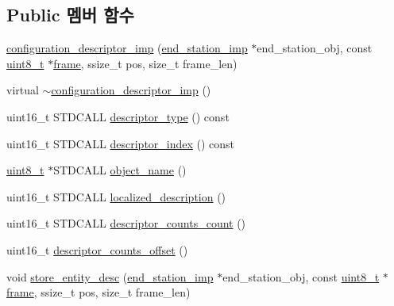 \subsection*{Public 멤버 함수}
\begin{DoxyCompactItemize}
\item 
\hyperlink{classavdecc__lib_1_1configuration__descriptor__imp_ac3616347ca0173a379b8e23fc19d210a}{configuration\+\_\+descriptor\+\_\+imp} (\hyperlink{classavdecc__lib_1_1end__station__imp}{end\+\_\+station\+\_\+imp} $\ast$end\+\_\+station\+\_\+obj, const \hyperlink{stdint_8h_aba7bc1797add20fe3efdf37ced1182c5}{uint8\+\_\+t} $\ast$\hyperlink{gst__avb__playbin_8c_ac8e710e0b5e994c0545d75d69868c6f0}{frame}, ssize\+\_\+t pos, size\+\_\+t frame\+\_\+len)
\item 
virtual \hyperlink{classavdecc__lib_1_1configuration__descriptor__imp_a2c8b5cc553c744375860e7c752cf40bd}{$\sim$configuration\+\_\+descriptor\+\_\+imp} ()
\item 
uint16\+\_\+t S\+T\+D\+C\+A\+LL \hyperlink{classavdecc__lib_1_1configuration__descriptor__imp_aefc543029ab093823c3f5b9d84f0ccc4}{descriptor\+\_\+type} () const 
\item 
uint16\+\_\+t S\+T\+D\+C\+A\+LL \hyperlink{classavdecc__lib_1_1configuration__descriptor__imp_ac23c0a35276c07cfce8c8660700c2135}{descriptor\+\_\+index} () const 
\item 
\hyperlink{stdint_8h_aba7bc1797add20fe3efdf37ced1182c5}{uint8\+\_\+t} $\ast$S\+T\+D\+C\+A\+LL \hyperlink{classavdecc__lib_1_1configuration__descriptor__imp_a15837e3eb254ad44812cb766ae8cd53c}{object\+\_\+name} ()
\item 
uint16\+\_\+t S\+T\+D\+C\+A\+LL \hyperlink{classavdecc__lib_1_1configuration__descriptor__imp_aa94307532fbb37e2f986fee8fec79373}{localized\+\_\+description} ()
\item 
uint16\+\_\+t S\+T\+D\+C\+A\+LL \hyperlink{classavdecc__lib_1_1configuration__descriptor__imp_a2d700cbc2f59b626c8e24047a3604189}{descriptor\+\_\+counts\+\_\+count} ()
\item 
uint16\+\_\+t \hyperlink{classavdecc__lib_1_1configuration__descriptor__imp_ad334fc9cdf1a9094d61b0864b4317b10}{descriptor\+\_\+counts\+\_\+offset} ()
\item 
void \hyperlink{classavdecc__lib_1_1configuration__descriptor__imp_a3f2e021f0cf7b08ef36c263c91c4cfbe}{store\+\_\+entity\+\_\+desc} (\hyperlink{classavdecc__lib_1_1end__station__imp}{end\+\_\+station\+\_\+imp} $\ast$end\+\_\+station\+\_\+obj, const \hyperlink{stdint_8h_aba7bc1797add20fe3efdf37ced1182c5}{uint8\+\_\+t} $\ast$\hyperlink{gst__avb__playbin_8c_ac8e710e0b5e994c0545d75d69868c6f0}{frame}, ssize\+\_\+t pos, size\+\_\+t frame\+\_\+len)

\end{DoxyCompactItemize}
